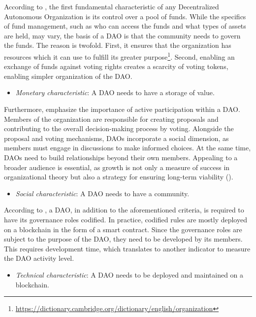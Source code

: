 According to \textcite{buterin2013ethereum}, the first fundamental characteristic of any Decentralized Autonomous Organization is its control over a pool of funds. 
While the specifics of fund management, such as who can access the funds and what types of assets are held, may vary, the basis of a DAO is that the community needs to govern the funds. 
The reason is twofold. First, it ensures that the organization has resources which it can use to fulfill its greater purpose\footnote{\href{https://dictionary.cambridge.org/dictionary/english/organization}{https://dictionary.cambridge.org/dictionary/english/organization}}. Second, enabling an exchange of funds against voting rights creates a scarcity of voting tokens, enabling simpler organization of the DAO.
\begin{itemize}
    \item \textit{Monetary characteristic}: A DAO needs to have a storage of value.
\end{itemize}

\noindent Furthermore, \textcite{hassan2021decentralized} emphasize the importance of active participation within a DAO. 
Members of the organization are responsible for creating proposals and contributing to the overall decision-making process by voting. 
Alongside the proposal and voting mechanisms, DAOs incorporate a social dimension, as members must engage in discussions to make informed choices. 
At the same time, DAOs need to build relationships beyond their own members. 
Appealing to a broader audience is essential, as growth is not only a measure of success in organizational theory but also a strategy for ensuring long-term viability (\cite{butlerorganizational}).
\begin{itemize}
    \item \textit{Social characteristic}: A DAO needs to have a community.
\end{itemize}

According to \textcite{dupont2017experiments}, a DAO, in addition to the aforementioned criteria, is required to have its governance roles codified. 
In practice, codified rules are mostly deployed on a blockchain in the form of a smart contract. 
Since the governance roles are subject to the purpose of the DAO, they need to be developed by its members. 
This requires development time, which translates to another indicator to measure the DAO activity level.
\begin{itemize}
    \item \textit{Technical characteristic}: A DAO needs to be deployed and maintained on a blockchain.
\end{itemize}

